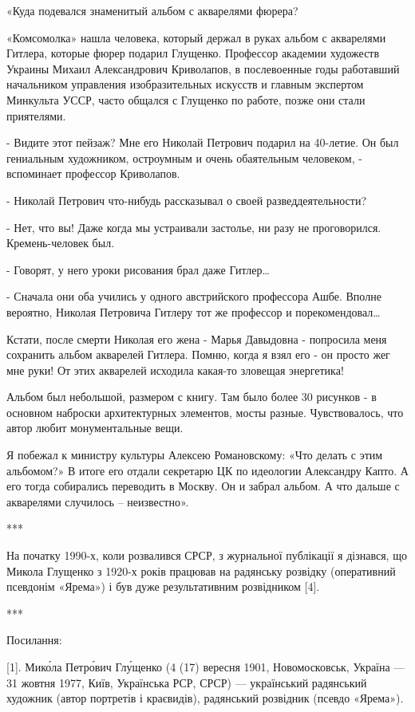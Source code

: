 «Куда подевался знаменитый альбом с акварелями фюрера?

«Комсомолка» нашла человека, который держал в руках альбом с акварелями
Гитлера, которые фюрер подарил Глущенко. Профессор академии художеств Украины
Михаил Александрович Криволапов, в послевоенные годы работавший начальником
управления изобразительных искусств и главным экспертом Минкульта УССР, часто
общался с Глущенко по работе, позже они стали приятелями.

- Видите этот пейзаж? Мне его Николай Петрович подарил на 40-летие. Он был
гениальным художником, остроумным и очень обаятельным человеком, - вспоминает
профессор Криволапов.

- Николай Петрович что-нибудь рассказывал о своей разведдеятельности?

- Нет, что вы! Даже когда мы устраивали застолье, ни разу не проговорился.
Кремень-человек был.

- Говорят, у него уроки рисования брал даже Гитлер…

- Сначала они оба учились у одного австрийского профессора Ашбе. Вполне
вероятно, Николая Петровича Гитлеру тот же профессор и порекомендовал…

Кстати, после смерти Николая его жена - Марья Давыдовна - попросила меня
сохранить альбом акварелей Гитлера. Помню, когда я взял его - он просто жег мне
руки! От этих акварелей исходила какая-то зловещая энергетика!

Альбом был небольшой, размером с книгу. Там было более 30 рисунков - в основном
наброски архитектурных элементов, мосты разные. Чувствовалось, что автор любит
монументальные вещи.

Я побежал к министру культуры Алексею Романовскому: «Что делать с этим
альбомом?» В итоге его отдали секретарю ЦК по идеологии Александру Капто. А его
тогда собирались переводить в Москву. Он и забрал альбом. А что дальше с
акварелями случилось – неизвестно».

***

На початку 1990-х, коли розвалився СРСР, з журнальної публікації я дізнався, що
Микола Глущенко з 1920-х років працював на радянську розвідку (оперативний
псевдонім «Ярема») і був дуже результативним розвідником [4]. 

***

Посилання:

[1]. Мико́ла Петро́вич Глу́щенко (4 (17) вересня 1901, Новомосковськ, Україна — 31
жовтня 1977, Київ, Українська РСР, СРСР) — український радянський художник
(автор портретів і краєвидів), радянський розвідник (псевдо «Ярема»). 

